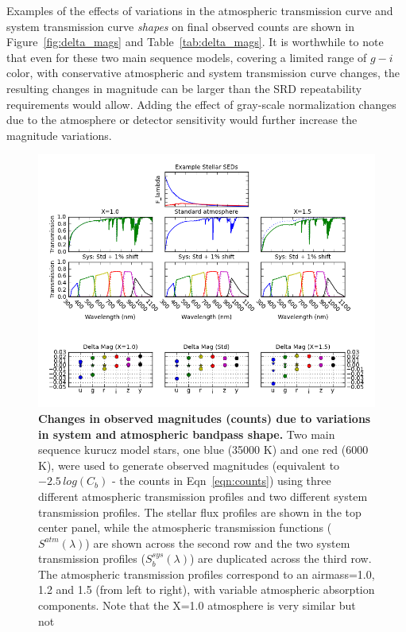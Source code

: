 \documentclass[12pt,preprint]{aastex}
\begin{document}
Examples of the effects of variations in the atmospheric transmission
curve and system transmission curve {\it shapes} on final observed
counts are shown in Figure~\ref{fig:delta_mags} and
Table~\ref{tab:delta_mags}. It is worthwhile to note that even for these two
main sequence models, covering a limited range of $g-i$ color, with
conservative atmospheric and system transmission curve changes, the
resulting changes in magnitude can be larger than the SRD
repeatability requirements would allow. Adding the effect of
gray-scale normalization changes due to the atmosphere or detector
sensitivity would further increase the magnitude variations. 

\begin{figure}[htbp]
\includegraphics[width=6in]{delta_mags}
\caption{ {\small {\bf Changes in observed magnitudes (counts) due to variations in
system and atmospheric bandpass shape.} Two main sequence kurucz model
stars, one blue (35000 K) and one red (6000 K), were used to generate
observed magnitudes (equivalent to $-2.5\, log(C_b)$ - the counts in
Eqn~\ref{eqn:counts}) using three different atmospheric transmission
profiles and two different system transmission profiles. The stellar
flux profiles are shown in the top center panel, while the atmospheric
transmission functions ($S^{atm}(\lambda)$) are shown across the
second row and the two system transmission profiles
($S_b^{sys}(\lambda)$) are duplicated across the third row. The
atmospheric transmission profiles correspond to an airmass=1.0, 1.2
and 1.5 (from left to right), with variable atmospheric absorption
components. Note that the X=1.0 atmosphere is very similar but not
}}
\end{figure}
\end{document}
